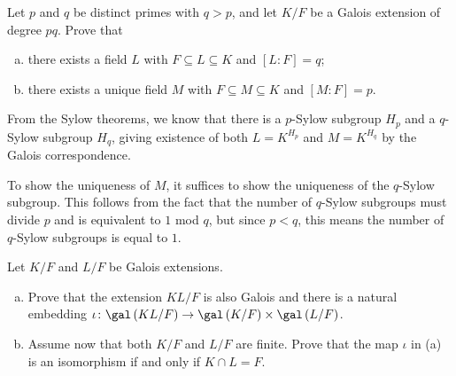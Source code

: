 \documentclass[10pt]{mypackage}
\begin{document}
\begin{solution}
\begin{enumerate}[(a)]
\begin{center}
      \end{center}
  \end{enumerate}
\end{solution}
\begin{problem}[Problem 3]
  Let $p$ and $q$ be distinct primes with $q > p$, and let $K/F$ be a Galois extension of degree $pq$. Prove that
  \begin{enumerate}[(a)]
    \item there exists a field $L$ with $F\subseteq L\subseteq K$ and $\left[ L:F \right] = q$;
    \item there exists a unique field $M$ with $F\subseteq M\subseteq K$ and $\left[ M:F \right] = p$.
  \end{enumerate}
\end{problem}
\begin{solution}
  From the Sylow theorems, we know that there is a $p$-Sylow subgroup $H_p$ and a $q$-Sylow subgroup $H_q$, giving existence of both $L = K^{H_p}$ and $M = K^{H_q}$ by the Galois correspondence.
  
  To show the uniqueness of $M$, it suffices to show the uniqueness of the $q$-Sylow subgroup. This follows from the fact that the number of $q$-Sylow subgroups must divide $p$ and is equivalent to $1$ mod $q$, but since $p < q$, this means the number of $q$-Sylow subgroups is equal to $1$.
\end{solution}
\begin{problem}[Problem 4]
  Let $K/F$ and $L/F$ be Galois extensions.
  \begin{enumerate}[(a)]
    \item Prove that the extension $KL/F$ is also Galois and there is a natural embedding $\iota\colon \gal\left( KL/F \right)\rightarrow \gal\left( K/F \right)\times \gal\left( L/F \right)$.
    \item Assume now that both $K/F$ and $L/F$ are finite. Prove that the map $\iota$ in (a) is an isomorphism if and only if $K\cap L = F$.
  \end{enumerate}
\end{problem}
\end{document}
